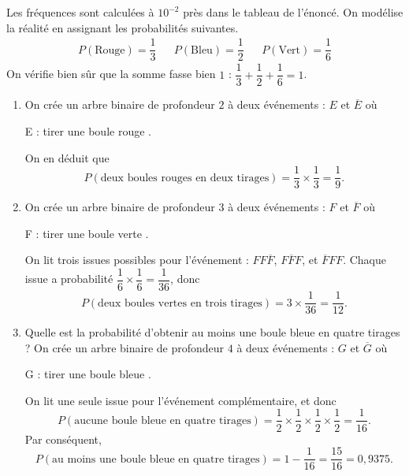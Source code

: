 \begin{sol}
	Les fréquences sont calculées à $10^{-2}$ près dans le tableau de l'énoncé.
	On modélise la réalité en assignant les probabilités suivantes.
		\begin{align*}
			P(\text{Rouge}) = \dfrac13 && P(\text{Bleu}) = \dfrac12 && P(\text{Vert}) = \dfrac16
		\end{align*}
	On vérifie bien sûr que la somme fasse bien $1$ : $\dfrac13 + \dfrac12 + \dfrac16 = 1$.

	\begin{enumerate}
		\item 
			On crée un arbre binaire de profondeur $2$ à deux événements : $E$ et $\overline{E}$ où
				\begin{center}
					E : \og tirer une boule rouge \fg.
				\end{center}
			On en déduit que
			\[ P(\text{deux boules rouges en deux tirages}) = \dfrac13 \times \dfrac13 = \dfrac19. \]
		\item 
			On crée un arbre binaire de profondeur $3$ à deux événements : $F$ et $\overline{F}$ où
				\begin{center}
					F : \og tirer une boule verte \fg.
				\end{center}
			On lit trois issues possibles pour l'événement : $FF\overline{F}$, $F\overline{F}F$, et $\overline{F}FF$.
			Chaque issue a probabilité $\dfrac16 \times \dfrac16 = \dfrac1{36}$, donc
			\[ P(\text{deux boules vertes en trois tirages}) = 3\times \dfrac1{36} = \dfrac1{12}. \]
		\item Quelle est la probabilité d'obtenir au moins une boule bleue en quatre tirages ?
			On crée un arbre binaire de profondeur $4$ à deux événements : $G$ et $\overline{G}$ où
				\begin{center}
					G : \og tirer une boule bleue \fg.
				\end{center}
			On lit une seule issue pour l'événement complémentaire, et donc
			\[ P(\text{aucune boule bleue en quatre tirages}) = \dfrac12\times\dfrac12\times\dfrac12\times\dfrac12= \dfrac{1}{16}. \]
			Par conséquent, 
			\[ P(\text{au moins une boule bleue en quatre tirages}) =1- \dfrac{1}{16} = \dfrac{15}{16} = 0,9375. \]
	\end{enumerate}
\end{sol}
\fi

